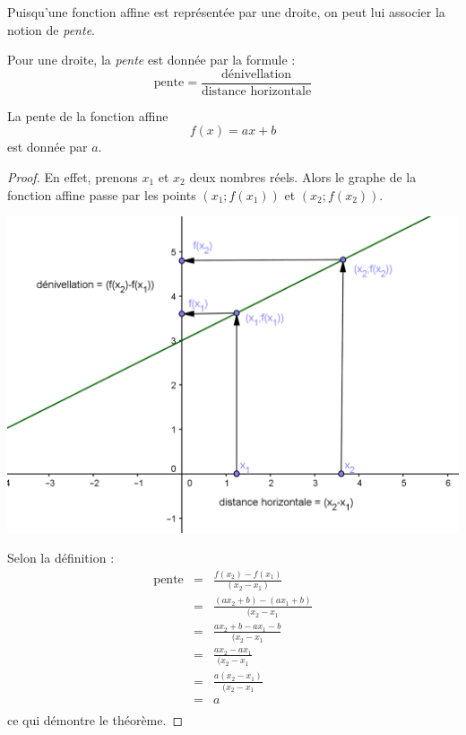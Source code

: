 Puisqu'une fonction affine est représentée par une droite, on peut lui associer la notion de \emph{pente}.

\begin{definition}\label{pente1}
Pour une droite, la \emph{pente} est donnée par la formule :
$$
\mbox{pente} = \frac{\mbox{dénivellation}}{\mbox{distance horizontale}}
$$
\end{definition}

\begin{theoreme}\label{thm:pente}
La pente de la fonction affine
$$
f(x) = ax + b
$$
est donnée par $a$.
\end{theoreme}

\begin{proof}
En effet, prenons $x_1$ et $x_2$ deux nombres réels. Alors le graphe de la fonction affine passe par les points $\left(x_1;f(x_1)\right)$ et $\left(x_2 ; f(x_2) \right)$.
\begin{center}
\includegraphics{affines/fct_pente.png}
\end{center}
Selon la définition :
$$
\begin{array}{lcl}
\mbox{pente} &=& \frac{f(x_2)-f(x_1)}{(x_2-x_1)} \\
&=& \frac{(ax_2+b)-(ax_1+b)}{(x_2-x_1}\\
&=& \frac{ax_2+b-ax_1-b}{(x_2-x_1}\\
&=& \frac{ax_2-ax_1}{(x_2-x_1}\\
&=& \frac{a(x_2-x_1)}{(x_2-x_1}\\
&=& a \\
\end{array}
$$
ce qui démontre le théorème.
\end{proof}


